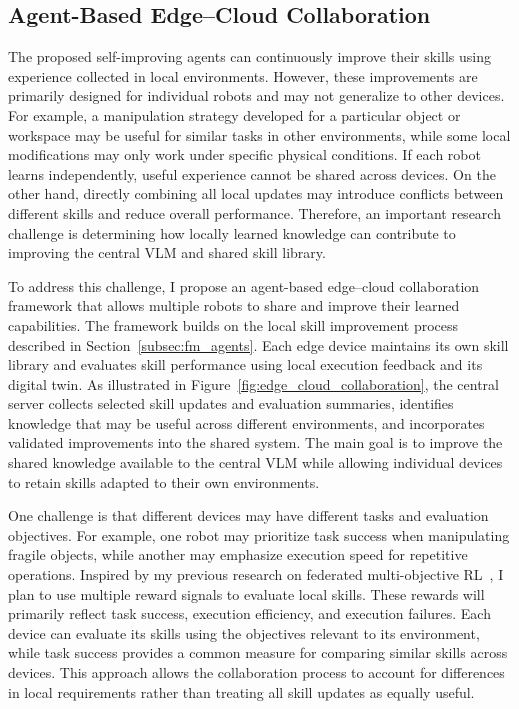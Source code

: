 \documentclass[11pt]{article}
\begin{document}
\subsection{Agent-Based Edge--Cloud Collaboration}
\label{subsec:agent_collaboration}

The proposed self-improving agents can continuously improve their skills using experience collected in local environments. However, these improvements are primarily designed for individual robots and may not generalize to other devices. For example, a manipulation strategy developed for a particular object or workspace may be useful for similar tasks in other environments, while some local modifications may only work under specific physical conditions. If each robot learns independently, useful experience cannot be shared across devices. On the other hand, directly combining all local updates may introduce conflicts between different skills and reduce overall performance. Therefore, an important research challenge is determining how locally learned knowledge can contribute to improving the central VLM and shared skill library.

To address this challenge, I propose an agent-based edge--cloud collaboration framework that allows multiple robots to share and improve their learned capabilities. The framework builds on the local skill improvement process described in Section~\ref{subsec:fm_agents}. Each edge device maintains its own skill library and evaluates skill performance using local execution feedback and its digital twin. As illustrated in Figure~\ref{fig:edge_cloud_collaboration}, the central server collects selected skill updates and evaluation summaries, identifies knowledge that may be useful across different environments, and incorporates validated improvements into the shared system. The main goal is to improve the shared knowledge available to the central VLM while allowing individual devices to retain skills adapted to their own environments.

One challenge is that different devices may have different tasks and evaluation objectives. For example, one robot may prioritize task success when manipulating fragile objects, while another may emphasize execution speed for repetitive operations. Inspired by my previous research on federated multi-objective RL~\cite{fedmoa2026}, I plan to use multiple reward signals to evaluate local skills. These rewards will primarily reflect task success, execution efficiency, and execution failures. Each device can evaluate its skills using the objectives relevant to its environment, while task success provides a common measure for comparing similar skills across devices. This approach allows the collaboration process to account for differences in local requirements rather than treating all skill updates as equally useful.
\end{document}
